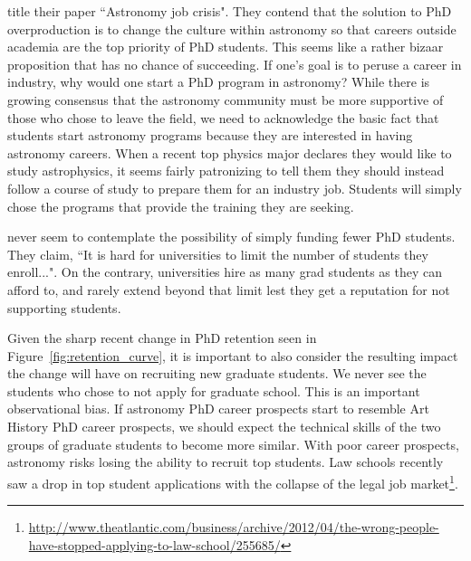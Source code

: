 \documentclass[preprint2]{aastex}
\begin{document}


\citet{Cooray15} title their paper ``Astronomy job crisis".  They contend that the solution to PhD overproduction is to change the culture within astronomy so that careers outside academia are the top priority of PhD students. This seems like a rather bizaar proposition that has no chance of succeeding. If one's goal is to peruse a career in industry, why would one start a PhD program in astronomy? While there is growing consensus that the astronomy community must be more supportive of those who chose to leave the field, we need to acknowledge the basic fact that students start astronomy programs because they are interested in having astronomy careers.  When a recent top physics major declares they would like to study astrophysics, it seems fairly patronizing to tell them they should instead follow a course of study to prepare them for an industry job. Students will simply chose the programs that provide the training they are seeking.

\citet{Cooray15} never seem to contemplate the possibility of simply funding fewer PhD students. They claim, ``It is hard for universities to limit the number of students they enroll...". On the contrary, universities hire as many grad students as they can afford to, and rarely extend beyond that limit lest they get a reputation for not supporting students.  

Given the sharp recent change in PhD retention seen in Figure~\ref{fig:retention_curve}, it is important to also consider the resulting impact the change will have on recruiting new graduate students. We never see the students who chose to not apply for graduate school. This is an important observational bias.  If astronomy PhD career prospects start to resemble Art History PhD career prospects, we should expect the technical skills of the two groups of graduate students to become more similar.  With poor career prospects, astronomy risks losing the ability to recruit top students. Law schools recently saw a drop in top student applications with the collapse of the legal job market\footnote{\url{http://www.theatlantic.com/business/archive/2012/04/the-wrong-people-have-stopped-applying-to-law-school/255685/}}.  
\end{document}
